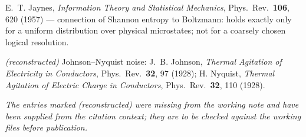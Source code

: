 \documentclass[11pt,a4paper]{article}
\begin{document}
\begin{description}[leftmargin=3.2em,style=sameline,itemsep=0.3em]
\item[{[B19]}] E.~T. Jaynes, \emph{Information Theory and Statistical Mechanics},
Phys.\ Rev.\ \textbf{106}, 620 (1957) --- connection of Shannon entropy to
Boltzmann: holds exactly only for a uniform distribution over physical
microstates; not for a coarsely chosen logical resolution.

\item[{[B20]}] \emph{(reconstructed)} Johnson--Nyquist noise: J.~B. Johnson,
\emph{Thermal Agitation of Electricity in Conductors}, Phys.\ Rev.\ \textbf{32},
97 (1928); H. Nyquist, \emph{Thermal Agitation of Electric Charge in Conductors},
Phys.\ Rev.\ \textbf{32}, 110 (1928).

\end{description}
\endgroup

\vspace{1em}
\noindent
{\small\itshape The entries marked \emph{(reconstructed)} were missing from the
working note and have been supplied from the citation context; they are to be
checked against the working files before publication.}
\end{document}
